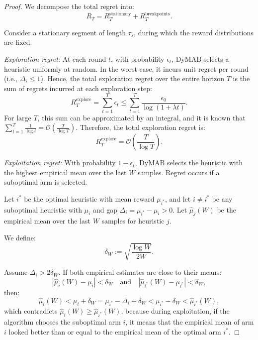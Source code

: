 \documentclass[review]{jair}
\begin{document}
\begin{proof}
We decompose the total regret into:
\begin{equation}
R_T = R_T^{\text{stationary}} + R_T^{\text{breakpoints}}.
\end{equation}

\noindent {}
Consider a stationary segment of length $\tau_s$, during which the reward distributions are fixed.

\noindent \textit{Exploration regret:} \newline
At each round $t$, with probability $\epsilon_t$, DyMAB selects a heuristic uniformly at random. In the worst case, it incurs unit regret per round (i.e., $\Delta_i \leq 1$). Hence, the total exploration regret over the entire horizon $T$ is the sum of regrets incurred at each exploration step:
\begin{equation}
R_T^{\text{explore}} = \sum_{t=1}^{T} \epsilon_t  \leq \sum_{t=1}^{T} \frac{\epsilon_0}{\log(1 + \lambda t)}.
\end{equation}
For large $T$, this sum can be approximated by an integral, and it is known that $\sum_{t=1}^{T} \frac{1}{\log t} = \mathcal{O}\left(\frac{T}{\log T}\right)$.
Therefore, the total exploration regret is:
\begin{equation}
R_T^{\text{explore}} = \mathcal{O}\left(\frac{T}{\log T}\right).
\end{equation}

\noindent \textit{Exploitation regret:} \newline
With probability $1 - \epsilon_t$, DyMAB selects the heuristic with the highest empirical mean over the last $W$ samples. Regret occurs if a suboptimal arm is selected.

Let $i^*$ be the optimal heuristic with mean reward $\mu_{i^*}$, and let $i \neq i^*$ be any suboptimal heuristic with $\mu_i$ and gap $\Delta_i = \mu_{i^*} - \mu_i > 0$. Let $\hat{\mu}_j(W)$ be the empirical mean over the last $W$ samples for heuristic $j$.

We define:
\begin{equation}
\delta_W := \sqrt{\frac{\log W}{2W}}.
\end{equation}

Assume $\Delta_i > 2\delta_W$. If both empirical estimates are close to their means:
\begin{equation}
|\hat{\mu}_i(W) - \mu_i| < \delta_W \quad \text{and} \quad |\hat{\mu}_{i^*}(W) - \mu_{i^*}| < \delta_W,
\end{equation}
then:
\begin{equation}
\hat{\mu}_i(W) < \mu_i + \delta_W = \mu_{i^*} - \Delta_i + \delta_W < \mu_{i^*} - \delta_W < \hat{\mu}_{i^*}(W),
\end{equation}
which contradicts $\hat{\mu}_i(W) \geq \hat{\mu}_{i^*}(W)$, because during exploitation, if the algorithm chooses the suboptimal arm $i$, it means that the empirical mean of arm $i$ looked better than or equal to the empirical mean of the optimal arm $i^*$.


\end{proof}
\end{document}
